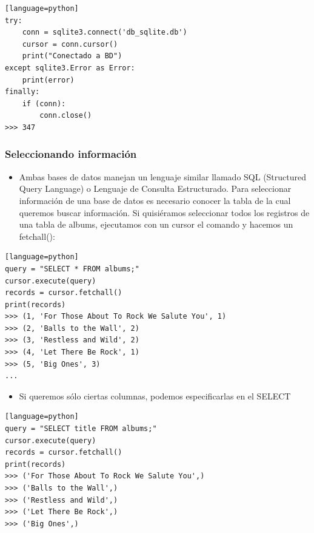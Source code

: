 \documentclass[hyperref={pdfpagelabels=false},xcolor=pst,pdf,fragile]{beamer}
\begin{document}
\begin{frame} [fragile]
    \begin{lstlisting}[basicstyle=\tiny][language=python]
try:
    conn = sqlite3.connect('db_sqlite.db')
    cursor = conn.cursor()
    print("Conectado a BD")
except sqlite3.Error as Error:
    print(error)
finally:
    if (conn):
        conn.close()
>>> 347

    \end{lstlisting}
\end{frame}

\begin{frame} [fragile]
    \frametitle{Seleccionando información}
    \begin{itemize}
    \item Ambas bases de datos manejan un lenguaje similar llamado SQL (Structured Query Language) o Lenguaje de Consulta Estructurado.
Para seleccionar información de una base de datos es necesario conocer la tabla de la cual queremos buscar información.
Si quisiéramos seleccionar todos los registros de una tabla de albums, ejecutamos con un cursor el comando y hacemos un fetchall():
    \end{itemize}
    \begin{lstlisting}[basicstyle=\tiny][language=python]
query = "SELECT * FROM albums;"
cursor.execute(query)
records = cursor.fetchall()
print(records)
>>> (1, 'For Those About To Rock We Salute You', 1)
>>> (2, 'Balls to the Wall', 2)
>>> (3, 'Restless and Wild', 2)
>>> (4, 'Let There Be Rock', 1)
>>> (5, 'Big Ones', 3)
...
    \end{lstlisting}
\end{frame}

\begin{frame} [fragile]
    \begin{itemize}
    \item Si queremos sólo ciertas columnas, podemos especificarlas en el SELECT
    \end{itemize}
    \begin{lstlisting}[basicstyle=\tiny][language=python]
query = "SELECT title FROM albums;"
cursor.execute(query)
records = cursor.fetchall()
print(records)
>>> ('For Those About To Rock We Salute You',)
>>> ('Balls to the Wall',)
>>> ('Restless and Wild',)
>>> ('Let There Be Rock',)
>>> ('Big Ones',)
    \end{lstlisting}
\end{frame}
\end{document}
